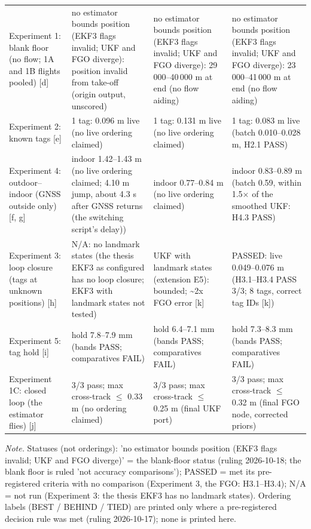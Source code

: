 \begin{table}[htbp]
\begin{tabular}{p{}p{}p{}p{}}
Experiment 1: blank floor (no flow; 1A and 1B flights pooled) [d] & no estimator bounds position (EKF3 flags invalid; UKF and FGO diverge): position invalid from take-off (origin output, unscored) & no estimator bounds position (EKF3 flags invalid; UKF and FGO diverge): 29\,000--40\,000 m at end \textdagger{} (no flow aiding) & no estimator bounds position (EKF3 flags invalid; UKF and FGO diverge): 23\,000--41\,000 m at end \textdagger{} (no flow aiding) \\
Experiment 2: known tags [e] & 1 tag: 0.096 m live (no live ordering claimed) & 1 tag: 0.131 m live (no live ordering claimed) & 1 tag: 0.083 m live (batch 0.010--0.028 m, H2.1 PASS) \\
Experiment 4: outdoor--indoor (GNSS outside only) [f, g] & indoor 1.42--1.43 m (no live ordering claimed; 4.10 m jump, about 4.3 s after GNSS returns (the switching script's delay)) & indoor 0.77--0.84 m (no live ordering claimed) & indoor 0.83--0.89 m (batch 0.59, within 1.5$\times$ of the smoothed UKF: H4.3 PASS) \\
Experiment 3: loop closure (tags at unknown positions) [h] & N/A: no landmark states (the thesis EKF3 as configured has no loop closure; EKF3 with landmark states not tested) & UKF with landmark states (extension E5): bounded; \textasciitilde{}2x FGO error [k] & PASSED: live 0.049--0.076 m (H3.1--H3.4 PASS 3/3; 8 tags, correct tag IDs [k]) \\
Experiment 5: tag hold [i] & hold 7.8--7.9 mm (bands PASS; comparatives FAIL) & hold 6.4--7.1 mm (bands PASS; comparatives FAIL) & hold 7.3--8.3 mm (bands PASS; comparatives FAIL) \\
Experiment 1C: closed loop (the estimator flies) [j] & 3/3 pass; max cross-track $\le$ 0.33 m (no ordering claimed) & 3/3 pass; max cross-track $\le$ 0.25 m (final UKF port) & 3/3 pass; max cross-track $\le$ 0.32 m (final FGO node, corrected priors) \\
\bottomrule
\end{tabular}
\par\smallskip\raggedright
\textit{Note.} Statuses (not orderings): 'no estimator bounds position (EKF3 flags invalid; UKF and FGO diverge)' = the blank-floor status (ruling 2026-10-18; the blank floor is ruled 'not accuracy comparisons'); PASSED = met its pre-registered criteria with no comparison (Experiment 3, the FGO: H3.1--H3.4); N/A = not run (Experiment 3: the thesis EKF3 has no landmark states). Ordering labels (BEST / BEHIND / TIED) are printed only where a pre-registered decision rule was met (ruling 2026-10-17); none is printed here.\par

\end{table}
